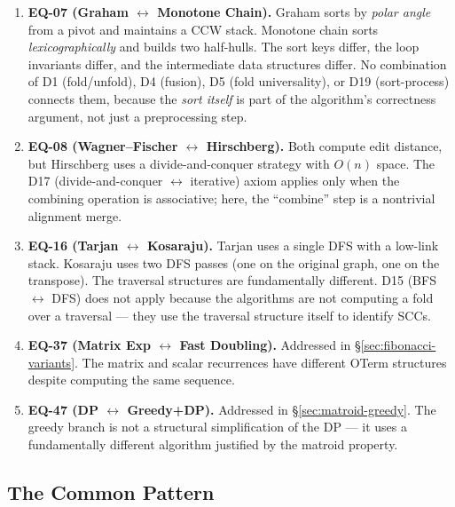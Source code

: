 \begin{enumerate}
  \item \textbf{EQ-07 (Graham $\leftrightarrow$ Monotone Chain).}
    Graham sorts by \emph{polar angle} from a pivot and maintains a
    CCW stack.  Monotone chain sorts \emph{lexicographically} and
    builds two half-hulls.  The sort keys differ, the loop invariants
    differ, and the intermediate data structures differ.  No
    combination of D1 (fold/unfold), D4 (fusion), D5 (fold
    universality), or D19 (sort-process) connects them, because the
    \emph{sort itself} is part of the algorithm's correctness argument,
    not just a preprocessing step.

  \item \textbf{EQ-08 (Wagner--Fischer $\leftrightarrow$ Hirschberg).}
    Both compute edit distance, but Hirschberg uses a
    divide-and-conquer strategy with $O(n)$ space.  The D17
    (divide-and-conquer $\leftrightarrow$ iterative) axiom applies
    only when the combining operation is associative; here, the
    ``combine'' step is a nontrivial alignment merge.

  \item \textbf{EQ-16 (Tarjan $\leftrightarrow$ Kosaraju).}
    Tarjan uses a single DFS with a low-link stack.
    Kosaraju uses two DFS passes (one on the original graph, one on
    the transpose).  The traversal structures are fundamentally
    different.  D15 (BFS $\leftrightarrow$ DFS) does not apply
    because the algorithms are not computing a fold over a traversal
    --- they use the traversal structure itself to identify SCCs.

  \item \textbf{EQ-37 (Matrix Exp $\leftrightarrow$ Fast Doubling).}
    Addressed in \S\ref{sec:fibonacci-variants}.  The matrix and
    scalar recurrences have different OTerm structures despite
    computing the same sequence.

  \item \textbf{EQ-47 (DP $\leftrightarrow$ Greedy+DP).}
    Addressed in \S\ref{sec:matroid-greedy}.  The greedy branch is
    not a structural simplification of the DP --- it uses a
    fundamentally different algorithm justified by the matroid
    property.
\end{enumerate}

\subsection{The Common Pattern}

